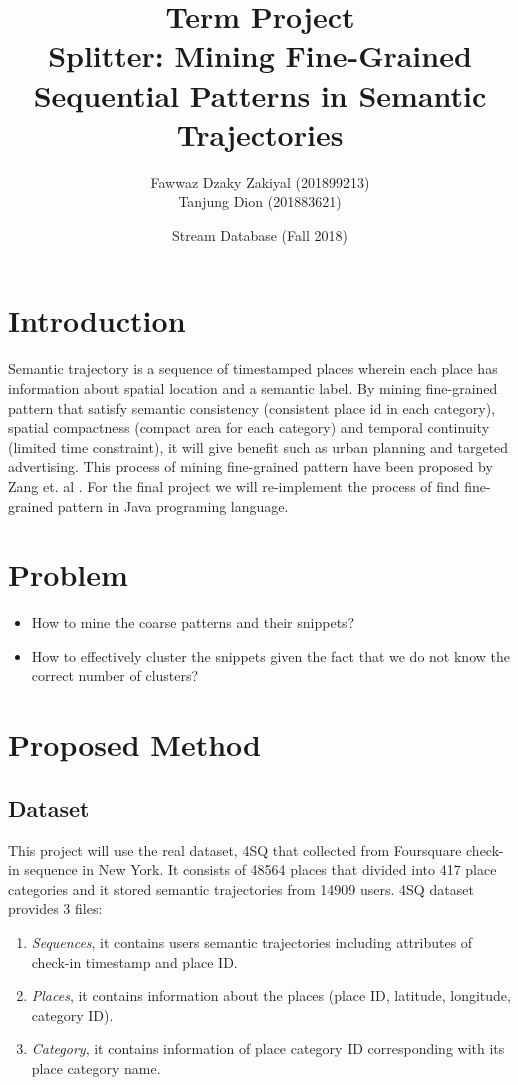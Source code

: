 \documentclass[a4paper,oneside]{article}
\title{Term Project\\Splitter: Mining Fine-Grained Sequential Patterns in Semantic Trajectories}
\author{Fawwaz Dzaky Zakiyal (201899213)\\Tanjung Dion (201883621)\\}
\date{Stream Database (Fall 2018)}
\begin{document}
	\maketitle
	
	\section{Introduction}
	Semantic trajectory is a sequence of timestamped places wherein each place has information about spatial location and a semantic label. By mining fine-grained pattern that satisfy semantic consistency (consistent place id in each category), spatial compactness (compact area for each category) and temporal continuity (limited time constraint), it will give benefit such as urban planning and targeted advertising. This process of mining fine-grained pattern have been proposed by Zang et. al \cite{splitter}. For the final project we will re-implement the process of find fine-grained pattern in Java programing language.
	
	\section{Problem}
	\begin{itemize}
		\item How to mine the coarse patterns and their snippets? 
		\item How to effectively cluster the snippets given the fact that we do not know the correct number of clusters?
	\end{itemize}
	
	 
	\section{Proposed Method}
		 \subsection{Dataset}
		 This project will use the real dataset, 4SQ that collected from Foursquare check-in sequence in New York. It consists of 48564 places that divided into 417 place categories and it stored semantic trajectories from 14909 users. 4SQ dataset provides 3 files:
		 \begin{enumerate}
		 \item \textit{Sequences}, it contains users semantic trajectories including attributes of check-in timestamp and place ID.
		 \item \textit{Places}, it contains information about the places (place ID, latitude, longitude, category ID).
		 \item \textit{Category}, it contains information of place category ID corresponding with its place category name.
		 \end{enumerate}
\end{document}
